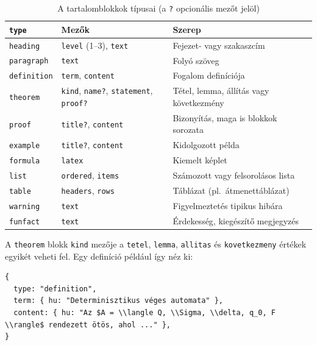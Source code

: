 \documentclass[12pt,a4paper]{report}
\begin{document}
\begin{table}[htbp]
    \centering
    \begin{tabularx}{\textwidth}{l p{4.6cm} X}
        \toprule
        \textbf{\texttt{type}} & \textbf{Mezők} & \textbf{Szerep} \\
        \midrule
        \texttt{heading}    & \texttt{level} (1--3), \texttt{text}
                            & Fejezet- vagy szakaszcím \\
        \texttt{paragraph}  & \texttt{text}
                            & Folyó szöveg \\
        \texttt{definition} & \texttt{term}, \texttt{content}
                            & Fogalom definíciója \\
        \texttt{theorem}    & \texttt{kind}, \texttt{name?},
                              \texttt{statement}, \texttt{proof?}
                            & Tétel, lemma, állítás vagy következmény \\
        \texttt{proof}      & \texttt{title?}, \texttt{content}
                            & Bizonyítás, maga is blokkok sorozata \\
        \texttt{example}    & \texttt{title?}, \texttt{content}
                            & Kidolgozott példa \\
        \texttt{formula}    & \texttt{latex}
                            & Kiemelt képlet \\
        \texttt{list}       & \texttt{ordered}, \texttt{items}
                            & Számozott vagy felsorolásos lista \\
        \texttt{table}      & \texttt{headers}, \texttt{rows}
                            & Táblázat (pl.\ átmenettáblázat) \\
        \texttt{warning}    & \texttt{text}
                            & Figyelmeztetés tipikus hibára \\
        \texttt{funfact}    & \texttt{text}
                            & Érdekesség, kiegészítő megjegyzés \\
        \bottomrule
    \end{tabularx}
    \caption{A tartalomblokkok típusai (a \texttt{?} opcionális mezőt jelöl)}
    \label{tab:blocks}
\end{table}

A \texttt{theorem} blokk \texttt{kind} mezője a
\texttt{tetel}, \texttt{lemma}, \texttt{allitas} és
\texttt{kovetkezmeny} értékek egyikét veheti fel. Egy definíció például
így néz ki:

\begin{lstlisting}
{
  type: "definition",
  term: { hu: "Determinisztikus véges automata" },
  content: { hu: "Az $A = \\langle Q, \\Sigma, \\delta, q_0, F \\rangle$ rendezett ötös, ahol ..." },
}
\end{lstlisting}
\end{document}
